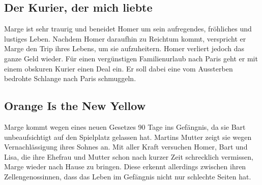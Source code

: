 
\subsection{Der Kurier, der mich liebte}
Marge ist sehr traurig und beneidet Homer um sein aufregendes, fröhliches und lustiges Leben. Nachdem Homer daraufhin zu Reichtum kommt, verspricht er Marge den Trip ihres Lebens, um sie aufzuheitern. Homer verliert jedoch das ganze Geld wieder. Für einen vergünstigen Familienurlaub nach Paris geht er mit einem obskuren Kurier einen Deal ein. Er soll dabei eine vom Aussterben bedrohte Schlange nach Paris schmuggeln.


\subsection{Orange Is the New Yellow}\label{VABF15}
Marge kommt wegen eines neuen Gesetzes 90 Tage ins Gefängnis, da sie Bart unbeaufsichtigt auf den Spielplatz gelassen hat. Martins Mutter zeigt sie wegen Vernachlässigung ihres Sohnes an. Mit aller Kraft versuchen Homer, Bart und Lisa, die ihre Ehefrau und Mutter schon nach kurzer Zeit schrecklich vermissen, Marge wieder nach Hause zu bringen. Diese erkennt allerdings zwischen ihren Zellengenossinnen, dass das Leben im Gefängnis nicht nur schlechte Seiten hat.

